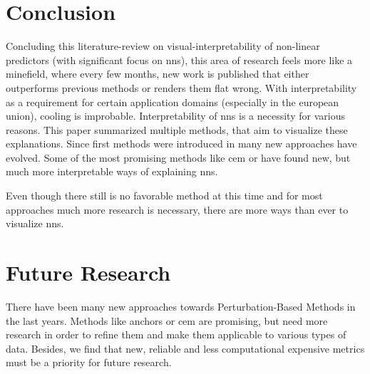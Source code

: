 \section{Conclusion}
Concluding this literature-review on visual-interpretability of non-linear predictors (with significant focus on \glspl{nn}), this area of research feels more like a minefield, where every few months, new work is published that either outperforms previous methods or renders them flat wrong. With interpretability as a requirement for certain application domains (especially in the european union), cooling is improbable. Interpretability of \glspl{nn} is a necessity for various reasons. This paper summarized multiple methods, that aim to visualize these explanations. Since first methods were introduced in \cite{RobnikSikonja.2008} many new approaches have evolved. Some of the most promising methods like \gls{cem} or  have found new, but much more interpretable ways of explaining \glspl{nn}. 
\par
Even though there still is no favorable method at this time and for most approaches much more research is necessary, there are more ways than ever to visualize \glspl{nn}.

\section{Future Research}
There have been many new approaches towards Perturbation-Based Methods in the last years. Methods like anchors or \gls{cem} are promising, but need more research in order to refine them and make them applicable to various types of data. Besides, we find that new, reliable and less computational expensive metrics must be a priority for future research.
